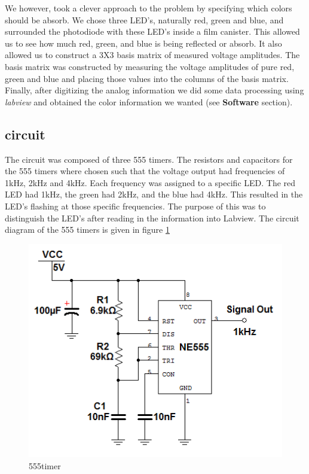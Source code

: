 \documentclass[paper=letter, fontsize=12pt]{article}
\begin{document}
We however, took a clever approach to the problem by specifying which colors should be absorb. We chose three LED's, naturally red, green and blue, and surrounded the photodiode with these LED's inside a film canister. This allowed us to see how much red, green, and blue is being reflected or absorb. It also allowed us to construct a 3X3 basis matrix of measured voltage amplitudes. The basis matrix was constructed by measuring the voltage amplitudes of pure red, green and blue and placing those values into the columns of the basis matrix. Finally, after digitizing the analog information we did some data processing using \textit{labview} and obtained the color information we wanted (see \textbf{Software} section).\\

\subsection*{circuit}

The circuit was composed of three 555 timers. The resistors and capacitors for the 555 timers where chosen such that the voltage output had frequencies of 1kHz, 2kHz and 4kHz. Each frequency was assigned to a specific LED. The red LED had 1kHz, the green had 2kHz, and the blue had 4kHz. This resulted in the LED's flashing at those specific frequencies. The purpose of this was to distinguish the LED's after reading in the information into Labview. The circuit diagram of the 555 timers is given in figure \ref*{timer}

	\begin{figure}[H]
	\centering
	\includegraphics[scale=.6]{555timer_1kHz.png}
	\caption{555timer}
	\label{timer}
	\end{figure}
\end{document}
